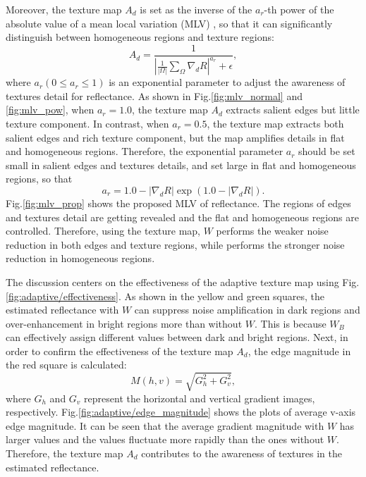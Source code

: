 Moreover, the texture map $A_{d}$ is set as the inverse of the $a_{r}$-th power of the absolute value of a mean local variation (MLV) \cite{jiep}, so that it can significantly distinguish between homogeneous regions and texture regions:
\begin{equation}
A_{d} = \frac{1}{\left |\frac{1}{|\Omega|}\sum_{\Omega}\nabla_{d}{R} \right|^{a_{r}} + \epsilon}, \label{eq: mlv}
\end{equation}
where $a_{r} (0 \leq a_{r} \leq 1)$ is an exponential parameter to adjust the awareness of textures detail for reflectance. 
As shown in Fig.\ref{fig:mlv_normal} and \ref{fig:mlv_pow}, when $a_{r}=1.0$, the texture map $A_{d}$ extracts salient edges but little texture component. In contrast, when $a_{r}=0.5$, the texture map extracts both salient edges and rich texture component, but the map amplifies details in flat and homogeneous regions. Therefore, the exponential parameter $a_{r}$ should be set small in salient edges and textures details, and set large in flat and homogeneous regions, so that
\begin{equation}
a_{r} = 1.0 - |\nabla_{d}{R}|\exp(1.0 - |\nabla_{d}{R}|). \label{eq:adaptive/parameter}
\end{equation}
Fig.\ref{fig:mlv_prop} shows the proposed MLV of reflectance. The regions of edges and textures detail are getting revealed and the flat and homogeneous regions are controlled. Therefore, using the texture map, $W$ performs the weaker noise reduction in both edges and texture regions, while performs the stronger noise reduction in homogeneous regions.\par
The discussion centers on the effectiveness of the adaptive texture map using Fig.\ref{fig:adaptive/effectiveness}.
As shown in the yellow and green squares, the estimated reflectance with $W$ can suppress noise amplification in dark regions and over-enhancement in bright regions more than without $W$. This is because $W_{B}$ can effectively assign different values between dark and bright regions. 
Next, in order to confirm the effectiveness of the texture map $A_{d}$, the edge magnitude in the red square is calculated:
\begin{equation}
M(h, v) = \sqrt{G_{h} ^{2}+ G_{v}^{2}}, \label{eq:maginitude}
\end{equation}
where $G_{h}$ and $G_{v}$ represent the horizontal and vertical gradient images, respectively. Fig.\ref{fig:adaptive/edge_magnitude} shows the plots of average v-axis edge magnitude. It can be seen that the average gradient magnitude with $W$ has larger values and the values fluctuate more rapidly than the ones without $W$. Therefore, the texture map $A_{d}$ contributes to the awareness of textures in the estimated reflectance.

